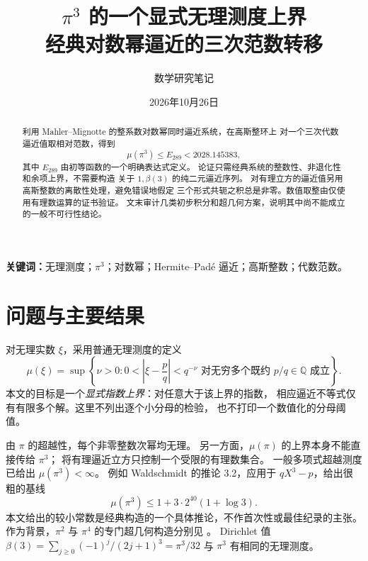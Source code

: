 \documentclass[UTF8,fontset=fandol,a4paper,11pt]{ctexart}
\title{\bfseries $\pi^3$ 的一个显式无理测度上界\\[0.35em]
  \large 经典对数幂逼近的三次范数转移}
\author{数学研究笔记}
\date{2026年10月26日}
\theoremstyle{remark}
\newcommand{\Q}{\mathbb Q}
\numberwithin{equation}{section}
\begin{document}
\maketitle
\noindent{}\par\medskip
\begin{abstract}
利用 Mahler--Mignotte 的整系数对数幂同时逼近系统，在高斯整环上
对一个三次代数逼近值取相对范数，得到
\[
  \mu(\pi^3)\le E_{289}<2028.145383,
\]
其中 $E_{289}$ 由初等函数的一个明确表达式定义。
论证只需经典系统的整数性、非退化性和余项上界，不需要构造
关于 $1,\beta(3)$ 的纯二元逼近序列。
对有理立方的逼近值另用高斯整数的离散性处理，避免错误地假定
三个形式共轭之积总是非零。数值取整由仅使用有理数运算的证书验证。
文末审计几类初步积分和超几何方案，说明其中尚不能成立的一般不可行性结论。
\end{abstract}
\noindent\textbf{关键词：}无理测度；$\pi^3$；对数幂；Hermite--Padé 逼近；高斯整数；代数范数。

\section{问题与主要结果}

对无理实数 $\xi$，采用普通无理测度的定义
\[
\mu(\xi)=\sup\left\{\nu>0:
0<\left|\xi-\frac pq\right|<q^{-\nu}
\text{ 对无穷多个既约 }p/q\in\Q\text{ 成立}\right\}.
\]
本文的目标是一个\emph{显式指数上界}：对任意大于该上界的指数，
相应逼近不等式仅有有限多个解。这里不列出逐个小分母的检验，
也不打印一个数值化的分母阈值。

由 $\pi$ 的超越性，每个非零整数次幂均无理。
另一方面，$\mu(\pi)$ 的上界本身不能直接传给 $\pi^3$；
将有理逼近立方只控制一个受限的有理数集合。
一般多项式超越测度已给出 $\mu(\pi^3)<\infty$。
例如 Waldschmidt 的推论 3.2\cite{Waldschmidt1978}，应用于
$qX^3-p$，给出很粗的基线
\begin{equation}\label{eq:baseline}
\mu(\pi^3)\le 1+3\cdot2^{40}(1+\log3).
\end{equation}
本文给出的较小常数是经典构造的一个具体推论，不作首次性或最佳纪录的主张。
作为背景，$\pi^2$ 与 $\pi^4$ 的专门超几何构造分别见
\cite{Zudilin2014,MarcovecchioZudilin2019}。
Dirichlet 值 $\beta(3)=\sum_{j\ge0}(-1)^j/(2j+1)^3=\pi^3/32$
与 $\pi^3$ 有相同的无理测度。
\end{document}
